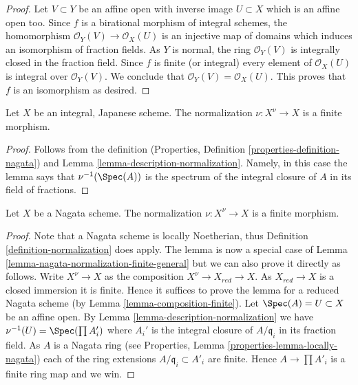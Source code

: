 \begin{proof}
Let $V \subset Y$ be an affine open
with inverse image $U \subset X$ which is an affine open too.
Since $f$ is a birational morphism of integral schemes, the homomorphism
$\mathcal{O}_Y(V) \to \mathcal{O}_X(U)$ is an injective map of domains
which induces an isomorphism of fraction fields. As $Y$ is normal,
the ring $\mathcal{O}_Y(V)$ is integrally closed in the fraction field.
Since $f$ is finite (or integral) every element of $\mathcal{O}_X(U)$
is integral over $\mathcal{O}_Y(V)$. We conclude that
$\mathcal{O}_Y(V) = \mathcal{O}_X(U)$. This proves that $f$ is an
isomorphism as desired.
\end{proof}

\begin{lemma}
\label{lemma-Japanese-normalization}
Let $X$ be an integral, Japanese scheme.
The normalization $\nu : X^\nu \to X$ is a finite morphism.
\end{lemma}

\begin{proof}
Follows from the definition
(Properties, Definition \ref{properties-definition-nagata}) and
Lemma \ref{lemma-description-normalization}. Namely, in this case
the lemma says that $\nu^{-1}(\Spec(A))$ is the spectrum
of the integral closure of $A$ in its field of fractions.
\end{proof}

\begin{lemma}
\label{lemma-nagata-normalization}
Let $X$ be a Nagata scheme.
The normalization $\nu : X^\nu \to X$ is a finite morphism.
\end{lemma}

\begin{proof}
Note that a Nagata scheme is locally Noetherian, thus
Definition \ref{definition-normalization}
does apply. The lemma is now a special case of
Lemma \ref{lemma-nagata-normalization-finite-general}
but we can also prove it directly as follows.
Write $X^\nu \to X$ as the composition
$X^\nu \to X_{red} \to X$. As $X_{red} \to X$ is a closed immersion
it is finite. Hence it suffices to prove the lemma for a reduced
Nagata scheme (by Lemma \ref{lemma-composition-finite}).
Let $\Spec(A) = U \subset X$ be an affine open.
By Lemma \ref{lemma-description-normalization} we have
$\nu^{-1}(U) = \Spec(\prod A_i')$ where $A_i'$ is the integral
closure of $A/\mathfrak q_i$ in its fraction field. As $A$ is a Nagata
ring (see Properties, Lemma \ref{properties-lemma-locally-nagata})
each of the ring extensions
$A/\mathfrak q_i \subset A'_i$ are finite. Hence $A \to \prod A'_i$
is a finite ring map and we win.
\end{proof}








